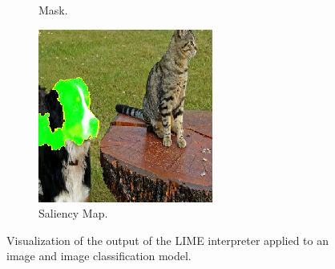 \documentclass[sigconf]{acmart}
\begin{document}
\begin{figure}[ht]
\begin{subfigure}{0.32\linewidth}
    \caption{Mask.}
    \label{fig:bird-a}
  \end{subfigure}
  \begin{subfigure}{0.32\linewidth}
    \includegraphics[width=\linewidth]{figures/lime_dog_map1.png}
    \caption{Saliency Map.}
    \label{fig:bird-a}
  \end{subfigure}
  \caption{Visualization of the output of the LIME interpreter applied to an image and image classification model.}\label{fig:lime_cat}
  \vspace{-0.3cm}
\end{figure}

\end{document}

